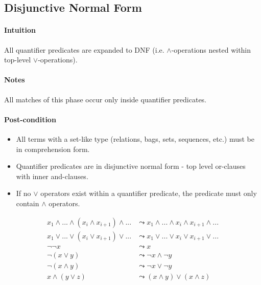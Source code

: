 \documentclass{article}
\begin{document}
\subsection{Disjunctive Normal Form}

\paragraph{Intuition} All quantifier predicates are expanded to DNF (i.e. $\land$-operations nested within top-level $\lor$-operations).

\paragraph{Notes} All matches of this phase occur only inside quantifier predicates.

\paragraph{Post-condition}
\begin{itemize}
  \item All terms with a set-like type (relations, bags, sets, sequences, etc.) must be in comprehension form.
  \item Quantifier predicates are in disjunctive normal form - top level or-clauses with inner and-clauses.
  \item If no $\lor$ operators exist within a quantifier predicate, the predicate must only contain $\land$ operators.
\end{itemize}

\noindent\begin{minipage}{\linewidth} %
\begin{align}
  \tag{Flatten Nested $\land$}
  x_1 \land ... \land (x_i \land x_{i+1}) \land ...
  &\leadsto
  x_1 \land ... \land x_i \land x_{i+1} \land ...
  \\
  \tag{Flatten Nested $\lor$}
  x_1 \lor ... \lor (x_i \lor x_{i+1}) \lor ...
  &\leadsto
  x_1 \lor ... \lor x_i \lor x_{i+1} \lor ...
  \\
  \tag{Double Negation}
  \lnot \lnot x
  &\leadsto
  x
  \\
  \tag{Distribute De Morgan - Or}
  \lnot (x \lor y)
  &\leadsto
  \lnot x \land \lnot y
  \\
  \tag{Distribute De Morgan - And}
  \lnot (x \land y)
  &\leadsto
  \lnot x \lor \lnot y
  \\
  \tag{Distribute $\land$ over $\lor$}
  x \land (y \lor z)
  &\leadsto
  (x \land y) \lor (x \land z)
\end{align}
\end{minipage}
\end{document}

